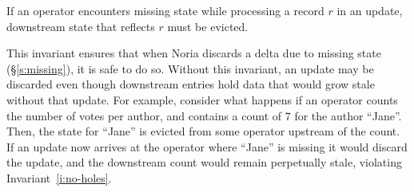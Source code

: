 
%
%
%

\begin{invariant}
  \label{i:missing-suffix}
  If an operator encounters missing state while processing a record $r$ in an
  update, downstream state that reflects $r$ must be evicted.
\end{invariant}

This invariant ensures that when Noria discards a delta due to missing state
(\S\ref{s:missing}), it is safe to do so. Without this invariant, an update may
be discarded even though downstream entries hold data that would grow stale
without that update. For example, consider what happens if an operator counts
the number of votes per author, and contains a count of 7 for the author
``Jane''. Then, the state for ``Jane'' is evicted from some operator upstream of
the count. If an update now arrives at the operator where ``Jane'' is missing it
would discard the update, and the downstream count would remain perpetually
stale, violating Invariant~\ref{i:no-holes}.

